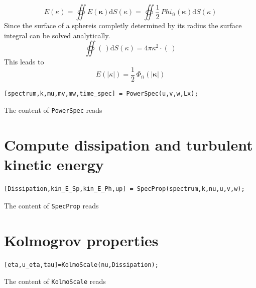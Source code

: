 \documentclass[ntfdMod]{elsarticle}
\begin{document}
\begin{par}

  \begin{equation}
      E(\kappa) = \oiint E(\boldsymbol\kappa)\mathrm{d}S(\kappa)
                = \oiint \frac{1}{2}\,Phi_{ii}(\boldsymbol\kappa)\mathrm{d}S(\kappa)
  \end{equation}
  Since the surface of a sphereis completly determined by its radius the
  surface integral can be solved analytically.
  \begin{equation}
      \oiint(\,)\mathrm{d}S(\kappa) = 4\pi\kappa^2\cdot(\,)
  \end{equation}
This leads to
  \begin{equation}
      E(|\kappa|) = \frac{1}{2}\,\Phi_{ii}(|\boldsymbol\kappa|)
  \end{equation}

\end{par} \vspace{1em}
\begin{lstlisting}
[spectrum,k,mu,mv,mw,time_spec] = PowerSpec(u,v,w,Lx);
\end{lstlisting}
\begin{par}

The content of \verb|PowerSpec| reads


\end{par} \vspace{1em}


\section{Compute dissipation and turbulent kinetic energy}

\begin{lstlisting}
[Dissipation,kin_E_Sp,kin_E_Ph,up] = SpecProp(spectrum,k,nu,u,v,w);
\end{lstlisting}
\begin{par}

The content of \verb|SpecProp| reads


\end{par} \vspace{1em}


\section{Kolmogrov properties}

\begin{lstlisting}
[eta,u_eta,tau]=KolmoScale(nu,Dissipation);
\end{lstlisting}
\begin{par}

The content of \verb|KolmoScale| reads


\end{par} \vspace{1em}
\end{document}
